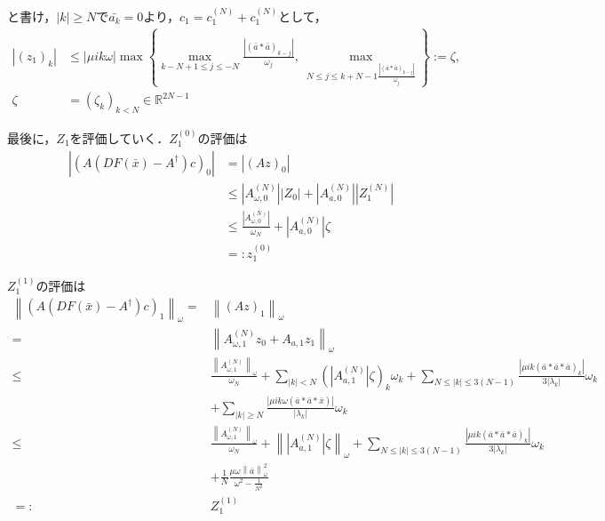 \documentclass[11pt,a4paper]{jsarticle}
\theoremstyle{definition}
\begin{document}
と書け，$|k| \geq N で \bar{a_k} = 0$より，$c_1 = c_1^{(N)} + c_1^{(N)}$として，
\begin{align*}
  |(z_1)_k| & \leq |\mu ik \omega| \max \left\{ \max_{k-N+1\leq j \leq -N} \frac{|\left( \bar{a} * \bar{a} \right)_{k-j}|}{\omega_j} ,\ \max_{N \leq j \leq k+N-1 \frac{|\left( \bar{a} * \bar{a}\right)_{k-j} |}{\omega_j}} \right\} := \zeta, \\
  \zeta     & = (\zeta_k)_{k < N} \in \mathbb{R}^{2N-1}
\end{align*}

最後に，$Z_1$を評価していく．$Z_1^{(0)}$の評価は
\begin{align*}
  |(A(DF(\bar{x})-A^\dagger)c)_0| & = |(Az)_0|                                                                                                \\
                                  & \leq \left|A_{\omega,0}^{(N)}\right| \left|Z_0\right| + \left|A_{a,0}^{(N)}\right| \left|Z_1^{(N)}\right| \\
                                  & \leq \frac{|A_{\omega, 0}^{(N)}|}{\omega_N} + \left|A_{a,0}^{(N)}\right| \zeta                            \\
                                  & =: z_1^{(0)}
\end{align*}

$Z_1^{(1)}$の評価は
\begin{equation*}
  \begin{split}
    \left\| (A(DF(\bar{x})-A^\dagger)c)_1 \right\|_\omega =& \left\| (Az)_1 \right\|_\omega \\
    =& \left\| A_{\omega,1}^{(N)} z_0 + A_{a,1} z_1 \right\|_\omega \\
    \leq& \frac{\left\| A_{\omega,1}^{(N)} \right\|_\omega}{\omega_N} + \sum_{|k|<N} \left( \left| A_{a,1}^{(N)} \right| \zeta \right)_k \omega_k + \sum_{N \leq |k| \leq 3(N-1)} \frac{\left| \mu ik \left( \bar{a} * \bar{a} * \bar{a} \right)_k \right|}{3\left| \lambda_k \right|} \omega_k \\
    &+ \sum_{|k| \geq N} \frac{\left| \mu ik \omega \left(\bar{a}*\bar{a}*\bar{x}\right) \right|}{\left| \lambda_k \right|} \omega_k \\
    \leq& \frac{\left\| A_{\omega,1}^{(N)} \right\|_\omega}{\omega_N} + \left\| \left| A_{a,1}^{(N)} \right| \zeta \right\|_\omega + \sum_{N\leq|k|\leq 3(N-1)} \frac{\left| \mu ik \left( \bar{a} * \bar{a} * \bar{a} \right)_k \right|}{3\left| \lambda_k \right|} \omega_k \\
    &+ \frac{1}{N} \frac{\mu \omega \left\|\bar{a}\right\|_\omega^2}{\omega^2-\frac{1}{N^2}}\\
    =:& Z_1^{(1)}
  \end{split}
\end{equation*}
\end{document}
